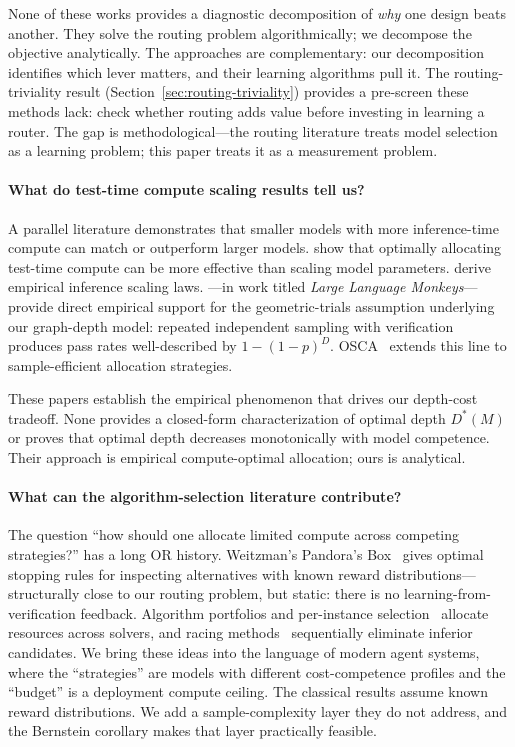 \documentclass[twoside,11pt]{article}
\newcommand{\Dstar}{D^*}
\begin{document}
None of these works provides a diagnostic decomposition of \emph{why} one design beats another.
They solve the routing problem algorithmically; we decompose the objective analytically.
The approaches are complementary: our decomposition identifies which lever matters, and their learning algorithms pull it.
The routing-triviality result (Section~\ref{sec:routing-triviality}) provides a pre-screen these methods lack: check whether routing adds value before investing in learning a router.
The gap is methodological---the routing literature treats model selection as a learning problem; this paper treats it as a measurement problem.

\paragraph{What do test-time compute scaling results tell us?}
A parallel literature demonstrates that smaller models with more inference-time compute can match or outperform larger models.
\citet{snell2025testtime} show that optimally allocating test-time compute can be more effective than scaling model parameters.
\citet{wu2025inference} derive empirical inference scaling laws.
\citet{brown2024monkeys}---in work titled \emph{Large Language Monkeys}---provide direct empirical support for the geometric-trials assumption underlying our graph-depth model: repeated independent sampling with verification produces pass rates well-described by $1-(1-p)^D$.
OSCA~\citep{osca2024} extends this line to sample-efficient allocation strategies.

These papers establish the empirical phenomenon that drives our depth-cost tradeoff.
None provides a closed-form characterization of optimal depth $\Dstar(M)$ or proves that optimal depth decreases monotonically with model competence.
Their approach is empirical compute-optimal allocation; ours is analytical.

\paragraph{What can the algorithm-selection literature contribute?}
The question ``how should one allocate limited compute across competing strategies?'' has a long OR history.
Weitzman's Pandora's Box~\citep{kaufmann2016bestarm} gives optimal stopping rules for inspecting alternatives with known reward distributions---structurally close to our routing problem, but static: there is no learning-from-verification feedback.
Algorithm portfolios and per-instance selection~\citep{xu2012satzilla,lindauer2015autofolio,kotthoff2016algorithm} allocate resources across solvers, and racing methods~\citep{kaufmann2016bestarm} sequentially eliminate inferior candidates.
We bring these ideas into the language of modern agent systems, where the ``strategies'' are models with different cost-competence profiles and the ``budget'' is a deployment compute ceiling.
The classical results assume known reward distributions.
We add a sample-complexity layer they do not address, and the Bernstein corollary makes that layer practically feasible.
\end{document}
